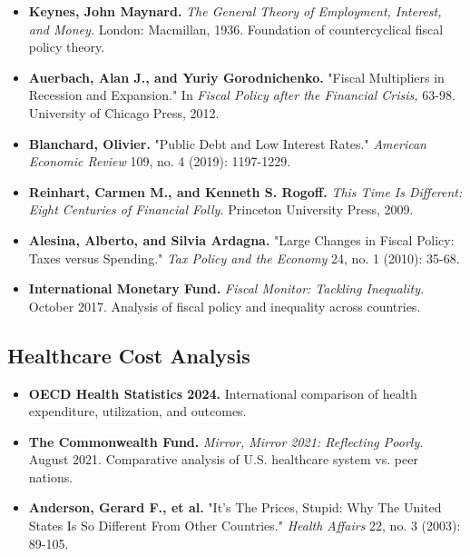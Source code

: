 \documentclass[12pt,letterpaper]{article}
\begin{document}
\begin{itemize}
    \item \textbf{Keynes, John Maynard.} \textit{The General Theory of Employment, Interest, and Money.} London: Macmillan, 1936. Foundation of countercyclical fiscal policy theory.

    \item \textbf{Auerbach, Alan J., and Yuriy Gorodnichenko.} "Fiscal Multipliers in Recession and Expansion." In \textit{Fiscal Policy after the Financial Crisis,} 63-98. University of Chicago Press, 2012.

    \item \textbf{Blanchard, Olivier.} "Public Debt and Low Interest Rates." \textit{American Economic Review} 109, no. 4 (2019): 1197-1229.

    \item \textbf{Reinhart, Carmen M., and Kenneth S. Rogoff.} \textit{This Time Is Different: Eight Centuries of Financial Folly.} Princeton University Press, 2009.

    \item \textbf{Alesina, Alberto, and Silvia Ardagna.} "Large Changes in Fiscal Policy: Taxes versus Spending." \textit{Tax Policy and the Economy} 24, no. 1 (2010): 35-68.

    \item \textbf{International Monetary Fund.} \textit{Fiscal Monitor: Tackling Inequality.} October 2017. Analysis of fiscal policy and inequality across countries.
\end{itemize}

\subsection{Healthcare Cost Analysis}

\begin{itemize}
    \item \textbf{OECD Health Statistics 2024.} International comparison of health expenditure, utilization, and outcomes.

    \item \textbf{The Commonwealth Fund.} \textit{Mirror, Mirror 2021: Reflecting Poorly.} August 2021. Comparative analysis of U.S. healthcare system vs. peer nations.

    \item \textbf{Anderson, Gerard F., et al.} "It's The Prices, Stupid: Why The United States Is So Different From Other Countries." \textit{Health Affairs} 22, no. 3 (2003): 89-105.
\end{itemize}
\end{document}

